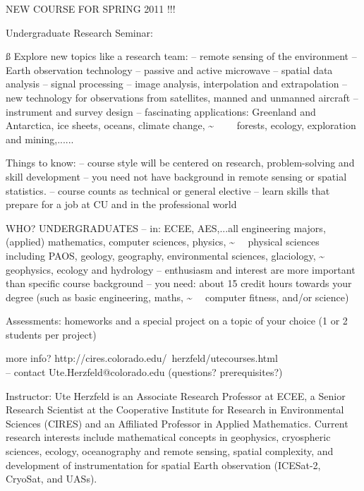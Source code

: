 \documentclass[12pt]{article}
\begin{document}
 NEW COURSE FOR SPRING 2011 !!!
 
 {\ittv   Undergraduate Research Seminar:}\nl
{\fontsize{14pt}{14pt}\selectfont {\bftv Remote Sensing, Signal Processing and Spatial Data Analysis\nl
(ECEN 4004, M/W 3:30-4:45  in ECCR 137, 3 credit hours)\nl
Faculty: Dr. Ute Herzfeld, Associate Research Professor, ECEE }}

\ss
{\bftv Explore new topics like a research team:}\nl
-- remote sensing of the environment\nl
-- Earth observation technology\nl
-- passive and active microwave\nl
-- spatial data analysis\nl
-- signal processing\nl
-- image analysis, interpolation and extrapolation\nl
-- new technology for observations from satellites, manned and unmanned aircraft\nl
-- instrument and survey design\nl
-- fascinating applications: Greenland and Antarctica, ice sheets, oceans, climate change, \nl
 \~~~~~ forests,
      ecology, exploration and mining,......

{\bftv Things to know:}\nl
--  course  style will be centered on research, problem-solving and skill development\nl
-- you need not have background in remote sensing or spatial statistics.\nl
-- course counts as technical or general elective\nl
-- learn skills that prepare for a job at CU and in the professional world


{\bftv WHO?  UNDERGRADUATES}\nl 
-- in: ECEE, AES,...all engineering majors, (applied) mathematics, computer sciences, physics,
 \~~~ physical sciences including PAOS, geology, geography, environmental sciences, glaciology, 
  \~~~ geophysics, ecology and hydrology\nl
-- enthusiasm and interest are more important than specific course background\nl
-- you need: about 15 credit hours towards your degree (such as basic engineering, maths,  \~~~ computer fitness, and/or science)

{\bftv Assessments:}\nl
 homeworks and a  special project on a topic of your choice (1 or 2 students per project)

{\bftv more info?} http://cires.colorado.edu/~herzfeld/utecourses.html\\
-- contact Ute.Herzfeld@colorado.edu (questions? prerequisites?)

{\bftv Instructor:}  Ute Herzfeld is an Associate Research Professor at ECEE, a Senior Research Scientist  at the Cooperative Institute for Research in Environmental Sciences (CIRES) and an Affiliated Professor  in Applied Mathematics. Current research interests include
mathematical concepts in geophysics, cryospheric sciences,  ecology, oceanography and remote sensing,
spatial complexity,  and development of instrumentation for spatial Earth observation (ICESat-2, CryoSat, and UASs).
\end{document}
